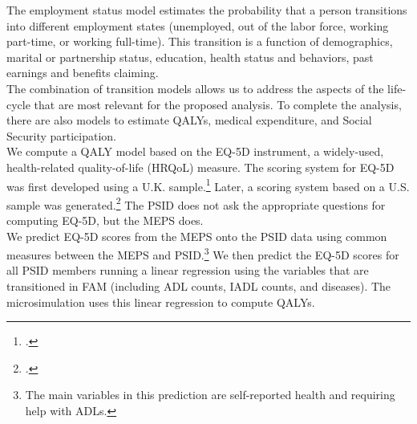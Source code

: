 \noindent The employment status model estimates the probability that a person transitions into different employment states (unemployed, out of the labor force, working part-time, or working full-time).  This transition is a function of demographics, marital or partnership status, education, health status and behaviors, past earnings and benefits claiming. \\



\noindent The combination of transition models allows us to address the aspects of the life-cycle that are most relevant for the proposed analysis. To complete the analysis, there are also models to estimate QALYs, medical expenditure, and Social Security participation. \\

\noindent We compute a QALY model based on the EQ-5D instrument, a widely-used, health-related
quality-of-life (HRQoL) measure. %
The scoring system for EQ-5D was first developed using a U.K. sample.\footnote{\citet{Dolan_1997_Modeling_MC}.} Later, a scoring system based on
a U.S. sample was generated.\footnote{\citet{Shaw_etal_2005_EQ5D_MC}.} The PSID does not ask the appropriate questions for computing EQ-5D, but the MEPS does. \\

\noindent We predict EQ-5D scores from the MEPS onto the PSID data using common measures between the MEPS and PSID.\footnote{The main variables in this prediction are self-reported health and requiring help with ADLs.} We then predict the EQ-5D scores for all PSID members running a linear regression using the variables that are transitioned in FAM (including ADL counts, IADL counts, and diseases). The microsimulation uses this linear regression to compute QALYs. \\
%



